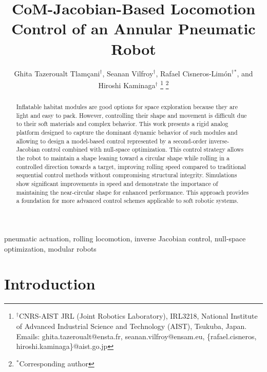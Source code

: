 \documentclass[a4paper, 10pt, conference]{ieeeconf}
\begin{document}
\title{\LARGE \bf CoM-Jacobian-Based Locomotion Control of an Annular Pneumatic Robot} 

\author{%
    Ghita Tazeroualt Tlamçani$^{\dagger}$,
    Seanan Vilfroy$^{\dagger}$,
    Rafael Cisneros-Limón$^{\dagger}$$^{*}$,
    and Hiroshi Kaminaga$^{\dagger}$%
    \thanks{$^{\dagger}$CNRS-AIST JRL (Joint Robotics Laboratory), IRL3218, National Institute of Advanced Industrial Science and Technology (AIST), Tsukuba, Japan. Emails: ghita.tazeroualt@ensta.fr, seanan.vilfroy@ensam.eu, \{rafael.cisneros, hiroshi.kaminaga\}@aist.go.jp}%
		\thanks{$^{*}$Corresponding author}%
}

\maketitle

\begin{abstract}

Inflatable habitat modules are good options for space exploration because they are light and easy to pack. However, controlling their shape and movement is difficult due to their soft materials and complex behavior. This work presents a rigid analog platform designed to capture the dominant dynamic behavior of such modules and allowing to design a model-based control represented by a second-order inverse-Jacobian control combined with null-space optimization. This control strategy allows the robot to maintain a shape leaning toward a circular shape while rolling in a controlled direction towards a target, improving rolling speed compared to traditional sequential control methods without compromising structural integrity. Simulations show significant improvements in speed and demonstrate the importance of maintaining the near-circular shape for enhanced performance. This approach provides a foundation for more advanced control schemes applicable to soft robotic systems.

\end{abstract}




\begin{keywords}
pneumatic actuation, rolling locomotion, inverse Jacobian control, null-space optimization, modular robots
\end{keywords}

\section{Introduction}
\end{document}
